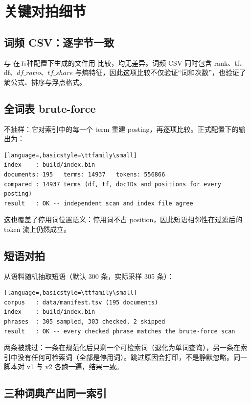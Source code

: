 \section{关键对拍细节}

\subsection{词频 CSV：逐字节一致}

 与  在五种配置下生成的文件用  比较，均无差异。词频 CSV 同时包含 rank、tf、df、$df\_ratio$、$tf\_share$ 与熵特征，因此这项比较不仅验证“词和次数”，也验证了熵公式、排序与浮点格式。

\subsection{全词表 brute-force}

 不抽样：它对索引中的每一个 term 重建 posting，再逐项比较。正式配置下的输出为：

\begin{lstlisting}[language=,basicstyle=\ttfamily\small]
index    : build/index.bin
documents: 195   terms: 14937   tokens: 556866
compared : 14937 terms (df, tf, docIDs and positions for every posting)
result   : OK -- independent scan and index file agree
\end{lstlisting}

这也覆盖了停用词位置语义：停用词不占 position，因此短语相邻性在过滤后的 token 流上仍然成立。

\subsection{短语对拍}

 从语料随机抽取短语（默认 300 条，实际采样 305 条）：

\begin{lstlisting}[language=,basicstyle=\ttfamily\small]
corpus   : data/manifest.tsv (195 documents)
index    : build/index.bin
phrases  : 305 sampled, 303 checked, 2 skipped
result   : OK -- every checked phrase matches the brute-force scan
\end{lstlisting}

两条被跳过：一条在规范化后只剩一个可检索词（退化为单词查询），另一条在索引中没有任何可检索词（全部是停用词）。跳过原因会打印，不是静默忽略。同一脚本对 v1 与 v2 各跑一遍，结果一致。

\subsection{三种词典产出同一索引}

